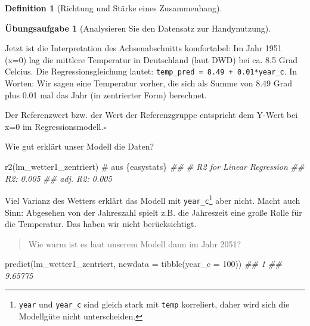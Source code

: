 \documentclass[
  a4paper,
  DIV=11]{scrreprt}
\newenvironment{Shaded}{\begin{snugshade}}{\end{snugshade}}
\newcommand{\AttributeTok}[1]{\textcolor[rgb]{0.40,0.45,0.13}{#1}}
\newcommand{\CommentTok}[1]{\textcolor[rgb]{0.37,0.37,0.37}{#1}}
\newcommand{\DecValTok}[1]{\textcolor[rgb]{0.68,0.00,0.00}{#1}}
\newcommand{\DocumentationTok}[1]{\textcolor[rgb]{0.37,0.37,0.37}{\textit{#1}}}
\newcommand{\FunctionTok}[1]{\textcolor[rgb]{0.28,0.35,0.67}{#1}}
\newcommand{\NormalTok}[1]{\textcolor[rgb]{0.00,0.23,0.31}{#1}}
\theoremstyle{definition}
\newtheorem{exercise}{Übungsaufgabe}[chapter]
\theoremstyle{definition}
\theoremstyle{definition}
\newtheorem{definition}{Definition}[chapter]
\theoremstyle{remark}
\begin{document}
\begin{definition}[Richtung und Stärke eines
Zusammenhang]
\begin{exercise}[Analysieren Sie den Datensatz zur
Handynutzung]
\begin{longtable}[]
\end{longtable}

Jetzt ist die Interpretation des Achsenabschnitts komfortabel: Im Jahr
1951 (x=0) lag die mittlere Temperatur in Deutschland (laut DWD) bei ca.
8.5 Grad Celcius. Die Regressionsgleichung lautet:
\texttt{temp\_pred\ =\ 8.49\ +\ 0.01*year\_c}. In Worten: Wir sagen eine
Temperatur vorher, die sich als Summe von 8.49 Grad plus 0.01 mal das
Jahr (in zentrierter Form) berechnet.

\begin{tcolorbox}[enhanced jigsaw, leftrule=.75mm, opacitybacktitle=0.6, colback=white, colframe=quarto-callout-important-color-frame, coltitle=black, colbacktitle=quarto-callout-important-color!10!white, opacityback=0, left=2mm, breakable, titlerule=0mm, toptitle=1mm, bottomtitle=1mm, rightrule=.15mm, title=\textcolor{quarto-callout-important-color}{\faExclamation}\hspace{0.5em}{Referenzwert entspricht Null}, arc=.35mm, bottomrule=.15mm, toprule=.15mm]

Der Referenzwert bzw. der Wert der Referenzgruppe entspricht dem Y-Wert
bei x=0 im Regressionsmodell.\(\square\)

\end{tcolorbox}

Wie gut erklärt unser Modell die Daten?

\begin{Shaded}
\begin{Highlighting}[]
\FunctionTok{r2}\NormalTok{(lm\_wetter1\_zentriert)  }\CommentTok{\# aus \textasciigrave{}\{easystats\}\textasciigrave{}}
\DocumentationTok{\#\# \# R2 for Linear Regression}
\DocumentationTok{\#\#        R2: 0.005}
\DocumentationTok{\#\#   adj. R2: 0.005}
\end{Highlighting}
\end{Shaded}

Viel Varianz des Wetters erklärt das Modell mit
\texttt{year\_c}\footnote{\texttt{year} und \texttt{year\_c} sind gleich
  stark mit \texttt{temp} korreliert, daher wird sich die Modellgüte
  nicht unterscheiden.} aber nicht. Macht auch Sinn: Abgesehen von der
Jahreszahl spielt z.B. die Jahreszeit eine große Rolle für die
Temperatur. Das haben wir nicht berücksichtigt.

\begin{quote}
{} Wie warm ist es laut unserem Modell dann im Jahr 2051?
\end{quote}

\begin{Shaded}
\begin{Highlighting}[]
\FunctionTok{predict}\NormalTok{(lm\_wetter1\_zentriert, }\AttributeTok{newdata =} \FunctionTok{tibble}\NormalTok{(}\AttributeTok{year\_c =} \DecValTok{100}\NormalTok{))}
\DocumentationTok{\#\#       1 }
\DocumentationTok{\#\# 9.65775}
\end{Highlighting}
\end{Shaded}


\end{exercise}
\end{definition}
\end{document}
